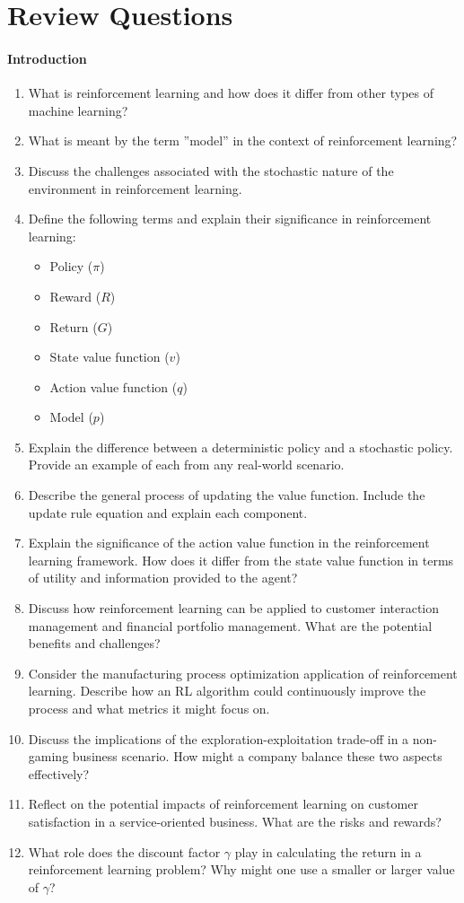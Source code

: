 \section{Review Questions}

\paragraph*{Introduction}
\begin{enumerate}[nosep]
\item What is reinforcement learning and how does it differ from other types of machine learning?
\item What is meant by the term ''model'' in the context of reinforcement learning?
\item Discuss the challenges associated with the stochastic nature of the environment in reinforcement learning.
\item Define the following terms and explain their significance in reinforcement learning:
\begin{itemize}
\item Policy ($\pi$)
\item Reward ($R$)
\item Return ($G$)
\item State value function ($v$)
\item Action value function ($q$)
\item Model ($p$)
\end{itemize}
\item Explain the difference between a deterministic policy and a stochastic policy. Provide an example of each from any real-world scenario.
\item Describe the general process of updating the value function. Include the update rule equation and explain each component.
\item Explain the significance of the action value function in the reinforcement learning framework. How does it differ from the state value function in terms of utility and information provided to the agent?
\item Discuss how reinforcement learning can be applied to customer interaction management and financial portfolio management. What are the potential benefits and challenges?
\item Consider the manufacturing process optimization application of reinforcement learning. Describe how an RL algorithm could continuously improve the process and what metrics it might focus on.
\item Discuss the implications of the exploration-exploitation trade-off in a non-gaming business scenario. How might a company balance these two aspects effectively?
\item Reflect on the potential impacts of reinforcement learning on customer satisfaction in a service-oriented business. What are the risks and rewards?
\item What role does the discount factor $\gamma$ play in calculating the return in a reinforcement learning problem? Why might one use a smaller or larger value of $\gamma$?
\end{enumerate}

